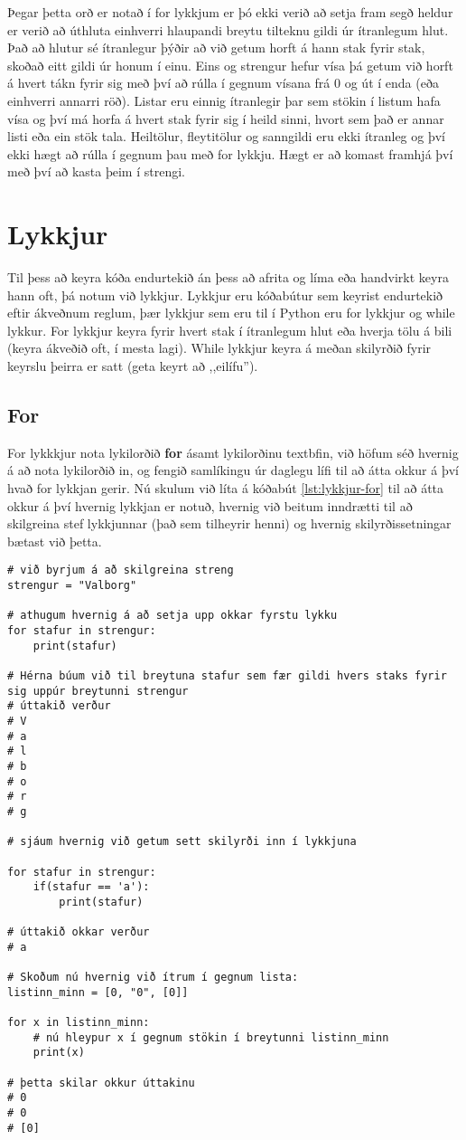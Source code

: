 Þegar þetta orð er notað í for lykkjum er þó ekki verið að setja fram segð heldur er verið að úthluta einhverri hlaupandi breytu tilteknu gildi úr ítranlegum hlut.
Það að hlutur sé ítranlegur þýðir að við getum horft á hann stak fyrir stak, skoðað eitt gildi úr honum í einu.
Eins og strengur hefur vísa þá getum við horft á hvert tákn fyrir sig með því að rúlla í gegnum vísana frá 0 og út í enda (eða einhverri annarri röð).
Listar eru einnig ítranlegir þar sem stökin í listum hafa vísa og því má horfa á hvert stak fyrir sig í heild sinni, hvort sem það er annar listi eða ein stök tala.
Heiltölur, fleytitölur og sanngildi eru ekki ítranleg og því ekki hægt að rúlla í gegnum þau með for lykkju.
Hægt er að komast framhjá því með því að kasta þeim í strengi.

\section{Lykkjur}
Til þess að keyra kóða endurtekið án þess að afrita og líma eða handvirkt keyra hann oft, þá notum við lykkjur.
Lykkjur eru kóðabútur sem keyrist endurtekið eftir ákveðnum reglum, þær lykkjur sem eru til í Python eru for lykkjur og while lykkur.
For lykkjur keyra fyrir hvert stak í ítranlegum hlut eða hverja tölu á bili (keyra ákveðið oft, í mesta lagi).
While lykkjur keyra á meðan skilyrðið fyrir keyrslu þeirra er satt (geta keyrt að ,,eilífu'').

\subsection{For}
For lykkkjur nota lykilorðið \textbf{for} ásamt lykilorðinu textbf{in}, við höfum séð hvernig á að nota lykilorðið in, og fengið samlíkingu úr daglegu lífi til að átta okkur á því hvað for lykkjan gerir.
Nú skulum við líta á kóðabút \ref{lst:lykkjur-for} til að átta okkur á því hvernig lykkjan er notuð, hvernig við beitum inndrætti til að skilgreina stef lykkjunnar (það sem tilheyrir henni) og hvernig skilyrðissetningar bætast við þetta.

\begin{lstlisting}[caption=For lykkjur, label=lst:lykkjur-for]
# við byrjum á að skilgreina streng
strengur = "Valborg"

# athugum hvernig á að setja upp okkar fyrstu lykku
for stafur in strengur:
	print(stafur)

# Hérna búum við til breytuna stafur sem fær gildi hvers staks fyrir sig uppúr breytunni strengur
# úttakið verður
# V
# a
# l
# b
# o
# r
# g

# sjáum hvernig við getum sett skilyrði inn í lykkjuna

for stafur in strengur:
	if(stafur == 'a'):
		print(stafur)
		
# úttakið okkar verður
# a

# Skoðum nú hvernig við ítrum í gegnum lista:
listinn_minn = [0, "0", [0]]

for x in listinn_minn:
	# nú hleypur x í gegnum stökin í breytunni listinn_minn
	print(x)
	
# þetta skilar okkur úttakinu
# 0
# 0
# [0]
\end{lstlisting}

